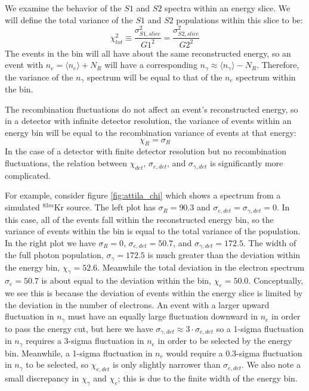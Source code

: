 We examine the behavior of the $S1$ and $S2$ spectra within an energy slice. We will define the total variance of the $S1$ and $S2$ populations within this slice to be:
\begin{equation}
\chi_{tot}^2\equiv  \frac{\sigma_{S1,slice}^2}{G1^2} = \frac{\sigma_{S2,slice}^2}{G2^2}
\end{equation}
The events in the bin will all have about the same reconstructed energy, so an event with $n_{e}=\langle n_{e} \rangle +N_R$ will have a corresponding $n_{\gamma}\approx \langle n_{\gamma} \rangle -N_R$. Therefore, the variance of the $n_{\gamma}$ spectrum will be equal to that of the $n_{e}$ spectrum within the bin. 

The recombination fluctuations do not affect an event's reconstructed energy, so in a detector with infinite detector resolution, the variance of events within an energy bin will be equal to the recombination variance of events at that energy:
\begin{equation} 
\chi_{R}=\sigma_{R}
\end{equation}
In the case of a detector with finite detector resolution but no recombination fluctuations, the relation between $\chi_{det}$, $\sigma_{e,det}$, and $\sigma_{\gamma,det}$ is significantly more complicated. 

For example, consider figure \ref{fig:attila_chi} which shows a spectrum from a simulated $^{83m}$Kr source. The left plot has $\sigma_R=90.3$ and $\sigma_{e,det}=\sigma_{\gamma,det}=0$. In this case, all of the events fall within the reconstructed energy bin, so the variance of events within the bin is equal to the total variance of the population. In the right plot we have $\sigma_R=0$, $\sigma_{e,det}=50.7$, and $\sigma_{\gamma,det}=172.5$. The width of the full photon population, $\sigma_{\gamma}=172.5$ is much greater than the deviation within the energy bin, $\chi_{\gamma}=52.6$. Meanwhile the total deviation in the electron spectrum $\sigma_{e}=50.7$ is about equal to the deviation within the bin, $\chi_e=50.0$. Conceptually, we see this is because the deviation of events within the energy slice is limited by the deviation in the number of electrons. An event with a larger upward fluctuation in $n_{\gamma}$ must have an equally large fluctuation downward in $n_{e}$ in order to pass the energy cut, but here we have $\sigma_{\gamma,det} \approx 3 \cdot \sigma_{e,det}$ so a 1-sigma fluctuation in $n_{\gamma}$ requires a 3-sigma fluctuation in $n_{e}$ in order to be selected by the energy bin. Meanwhile, a 1-sigma fluctuation in $n_{e}$ would require a 0.3-sigma fluctuation in $n_{\gamma}$ to be selected, so $\chi_{e,det}$ is only slightly narrower than $\sigma_{e,det}$. We also note a small discrepancy in $\chi_{\gamma}$ and $\chi_e$; this is due to the finite width of the energy bin\cite{attila}. 

